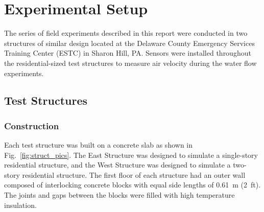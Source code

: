 \documentclass[12pt,oneside]{book}
\begin{document}
\section{Experimental Setup}
\label{sec:exp_setup}
The series of field experiments described in this report were conducted in two structures of similar design located at the Delaware County Emergency Services Training Center (ESTC) in Sharon Hill, PA. Sensors were installed throughout the residential-sized test structures to measure air velocity during the water flow experiments.  

\subsection{Test Structures}
\label{sec:test_structs}

\subsubsection{Construction}
\label{sec:construction}
Each test structure was built on a concrete slab as shown in Fig.~\ref{fig:struct_pics}. The East Structure was designed to simulate a single-story residential structure, and the West Structure was designed to simulate a two-story residential structure. The first floor of each structure had an outer wall composed of interlocking concrete blocks with equal side lengths of 0.61~m (2~ft). The joints and gaps between the blocks were filled with high temperature insulation.
\end{document}
